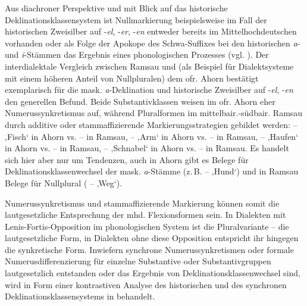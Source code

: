Aus diachroner Perspektive und mit Blick auf das historische Deklinationsklassensystem ist Nullmarkierung beispielsweise im Fall der historischen Zweisilber auf -\textit{el}, -\textit{er}, -\textit{en} entweder bereits im Mittelhochdeutschen vorhanden oder als Folge der Apokope des Schwa-Suffixes bei den historischen \textit{a}{}- und \textit{i}{}-Stämmen das Ergebnis eines phonologischen Prozesses (vgl. ). Der interdialektale Vergleich zwischen Ramsau und (als Beispiel für Dialektsysteme mit einem höheren Anteil von Nullpluralen) dem ofr. Ahorn bestätigt exemplarisch für die mask. \textit{a}{}-Deklination und historische Zweisilber auf -\textit{el}, -\textit{en} den generellen Befund. Beide Substantivklassen weisen im ofr. Ahorn eher Numerussynkretismus auf, während Pluralformen im mittelbair.-südbair. Ramsau durch additive oder stammaffizierende Markierungsstrategien gebildet werden:   --   ‚Fisch‘ in Ahorn vs.  --  in Ramsau,   --   ‚Arm‘ in Ahorn vs.  --  in Ramsau,   --  ‚Haufen‘ in Ahorn vs.  --  in Ramsau,  --  ‚Schnabel‘ in Ahorn vs.  --  in Ramsau. Es handelt sich hier aber nur um Tendenzen, auch in Ahorn gibt es Belege für Deklinationsklassenwechsel der mask. \textit{a}{}-Stämme (z.\,B.   --  ‚Hund‘) und in Ramsau Belege für Nullplural ( --  ‚Weg‘).

Numerussynkretismus und stammaffizierende Markierung können somit die lautgesetzliche Entsprechung der mhd. Flexionsformen sein. In Dialekten mit Lenis-Fortis-Opposition im phonologischen System ist die Pluralvariante  --  die lautgesetzliche Form, in Dialekten ohne diese Opposition entspricht ihr hingegen die synkretische Form. Inwiefern synchrone Numerussynkretismen oder formale Numerusdifferenzierung für einzelne Substantive oder Substantivgruppen lautgesetzlich entstanden oder das Ergebnis von Deklinationsklassenwechsel sind, wird in Form einer kontrastiven Analyse des historischen und des synchronen Deklinationsklassensystems in  behandelt.

